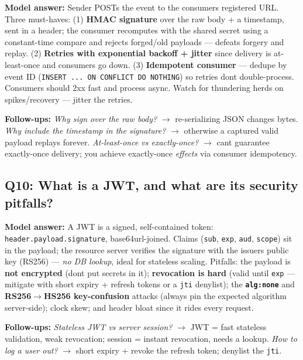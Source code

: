\documentclass[11pt]{article}
\begin{document}
\textbf{Model answer:} Sender POSTs the event to the consumer\textquotesingle s registered URL. Three must-haves: (1) \textbf{HMAC signature} over the raw body + a timestamp, sent in a header; the consumer recomputes with the shared secret using a constant-time compare and rejects forged/old payloads --- defeats forgery and replay. (2) \textbf{Retries with exponential backoff + jitter} since delivery is at-least-once and consumers go down. (3) \textbf{Idempotent consumer} --- dedupe by event ID (\texttt{INSERT\ ...\ ON\ CONFLICT\ DO\ NOTHING}) so retries don\textquotesingle t double-process. Consumers should 2xx fast and process async. Watch for thundering herds on spikes/recovery --- jitter the retries.

\textbf{Follow-ups:} \emph{Why sign over the raw body?} \(\rightarrow\) re-serializing JSON changes bytes. \emph{Why include the timestamp in the signature?} \(\rightarrow\) otherwise a captured valid payload replays forever. \emph{At-least-once vs exactly-once?} \(\rightarrow\) can\textquotesingle t guarantee exactly-once delivery; you achieve exactly-once \emph{effects} via consumer idempotency.

\subsection{Q10: What is a JWT, and what are its security pitfalls?}\label{q10-what-is-a-jwt-and-what-are-its-security-pitfalls}

\textbf{Model answer:} A JWT is a signed, self-contained token: \texttt{header.payload.signature}, base64url-joined. Claims (\texttt{sub}, \texttt{exp}, \texttt{aud}, \texttt{scope}) sit in the payload; the resource server verifies the signature with the issuer\textquotesingle s public key (RS256) --- \emph{no DB lookup}, ideal for stateless scaling. Pitfalls: the payload is \textbf{not encrypted} (don\textquotesingle t put secrets in it); \textbf{revocation is hard} (valid until \texttt{exp} --- mitigate with short expiry + refresh tokens or a \texttt{jti} denylist); the \textbf{\texttt{alg:none}} and \textbf{RS256\(\rightarrow\)HS256 key-confusion} attacks (always pin the expected algorithm server-side); clock skew; and header bloat since it rides every request.

\textbf{Follow-ups:} \emph{Stateless JWT vs server session?} \(\rightarrow\) JWT = fast stateless validation, weak revocation; session = instant revocation, needs a lookup. \emph{How to log a user out?} \(\rightarrow\) short expiry + revoke the refresh token; denylist the \texttt{jti}.
\end{document}
